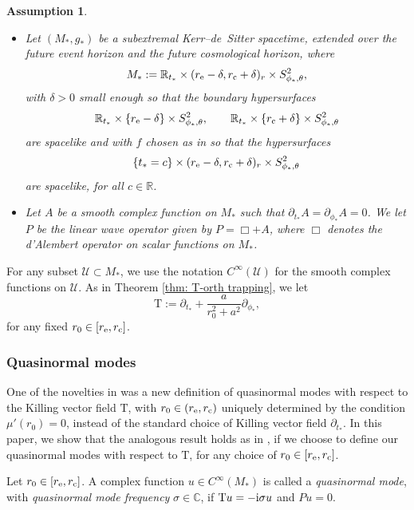 \documentclass[10pt,a4paper]{amsart}
\newcommand{\de}{\delta}
\renewcommand{\d}{\partial}
\newcommand{\U}{\mathcal U}
\newcommand{\T}{\mathrm T}
\newcommand{\s}{\sigma}
\newcommand{\R}[0]{\mathbb{R}}
\newcommand{\C}[0]{\mathbb{C}}
\numberwithin{equation}{section}
\newtheorem{Assumption}[Theorem]{Assumption}
\begin{document}
\begin{Assumption} \label{ass: main wave} \
\begin{itemize}\itemsep=0pt
	\item Let $(M_*, g_*)$ be a subextremal Kerr--de~Sitter spacetime, extended over the future event horizon and the future cosmological horizon, where
\[
	M_* := \R_{t_*} \times (r_{\rm e} - \de, r_{\rm c} + \de)_r \times S^2_{\phi_*, \theta},
\]
with $\de > 0$ small enough so that the boundary hypersurfaces
\[
	\R_{t_*} \times \{r_{\rm e} - \de\} \times S^2_{\phi_*, \theta}, \qquad \R_{t_*} \times \{r_{\rm c} + \de\} \times S^2_{\phi_*, \theta}
\]
are \emph{spacelike} and with $f$ chosen as in {\rm \cite[Remark~1.1]{PV2023}} so that the hypersurfaces
\[
	\{t_* = c \} \times (r_{\rm e} - \de, r_{\rm c} + \de)_r \times S^2_{\phi_*, \theta}
\]
are \emph{spacelike}, for all $c \in \R$.
\item Let $A$ be a smooth complex function on $M_*$ such that
$
	\d_{t_*} A = \d_{\phi_*} A = 0$.
We let $P$ be the linear wave operator given by
$
	P = \Box + A$,
where $\Box$ denotes the d'Alembert operator on scalar functions on $M_*$.
\end{itemize}
\end{Assumption}


For any subset $\U \subset M_*$, we use the notation $C^\infty(\U)$ for the smooth complex functions on $\U$.
As in Theorem \ref{thm: T-orth trapping}, we let
\[
	\T
		:= \d_{t_*} + \frac{a}{r_0^2 + a^2} \d_{\phi_*},
\]
for any fixed $r_0 \in [r_{\rm e}, r_{\rm c}]$.

\subsubsection{Quasinormal modes}

One of the novelties in \cite{PV2023} was a new definition of quasinormal modes with respect to the Killing vector field $\T$, with $r_0 \in (r_{\rm e}, r_{\rm c})$ uniquely determined by the condition $\mu'(r_0) = 0$, instead of the standard choice of Killing vector field $\d_{t_*}$.
In this paper, we show that the analogous result holds as in \cite{PV2023}, if we choose to define our quasinormal modes with respect to $\T$, for any choice of $r_0 \in [r_{\rm e}, r_{\rm c}]$.

\begin{Definition} \label{def: QNMs}
Let $r_0 \in [r_{\rm e}, r_{\rm c}]$.
A complex function $u \in C^\infty(M_*)$ is called a {\em quasinormal mode}, with {\em quasinormal mode frequency} $\s \in \C$, if $\T u = -{\rm i} \s u$
and $P u = 0$.
\end{Definition}
\end{document}
